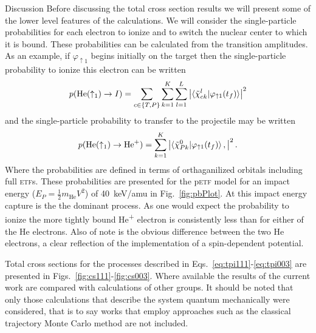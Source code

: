 \documentclass[aps, pra, reprint, groupedaddress, amsfonts, longbibliography,
               amsmath, amssymb, showpacs, nofootinbib]{revtex4-1}
\begin{document}
\begin{section}{Discussion \label{sec:disc}}
   Before discussing the total cross section results we will present some of the lower level features of
   the calculations. We will consider the single-particle probabilities for each electron to ionize and
   to switch the nuclear center to which it is bound. These probabilities can be calculated from the
   transition amplitudes. As an example, if $\varphi_{\uparrow 1}$ begins initially on the target then
   the single-particle probability to ionize this electron can be written
   \begin{equation} \label{eq:ionprob}
      p(\mathrm{He}(\uparrow_1) \rightarrow I ) =
         \sum\limits_{c \in \{T,P\}} \sum\limits_{k=1}^K \sum\limits_{l = 1}^L
         \left| \braket{ \tilde{\chi}^{l}_{c k} | \varphi_{\uparrow 1}(t_f)} \right|^2
   \end{equation}
   and the single-particle probability to transfer to the projectile may be written
   \begin{equation} \label{eq:transprob}
      p(\mathrm{He}(\uparrow_1) \rightarrow \mathrm{He}^+) =
         \sum\limits_{k=1}^K \left| \braket{ \tilde{\chi}^{0}_{P k} | \varphi_{\uparrow 1}(t_f)},
                             \right|^2.
   \end{equation}
   Where the probabilities are defined in terms of orthaganilized orbitals including full \textsc{etf}s.
   These probabilities are presented for the p\textsc{etf} model for an impact energy ($E_P =
   \frac{1}{2} m_\textrm{He} V^2$) of 40~keV/amu in Fig.~\ref{fig:pbPlot}. At this impact energy
   capture is the the dominant process. As one would expect the probability to ionize the more tightly
   bound He\textsuperscript{+} electron is consistently less than for either of the He electrons. Also
   of note is the obvious difference between the two He electrons, a clear reflection of the
   implementation of a spin-dependent potential.

   Total cross sections for the processes described in
   Eqs.~\eqref{eq:tpi111}-\eqref{eq:tpi003} are presented in Figs.~\ref{fig:cs111}-\ref{fig:cs003}.
   Where available the results of the current work are compared with calculations of other groups. It
   should be noted that only those calculations that describe the system quantum mechanically were
   considered, that is to say works that employ approaches such as the classical trajectory Monte Carlo
   method are not included.


\end{section}
\end{document}

